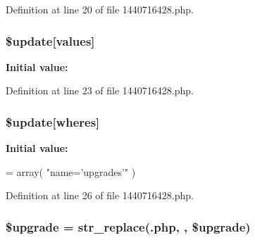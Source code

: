 Definition at line 20 of file 1440716428.\+php.

\subsubsection[{\texorpdfstring{\$update}{$update}}]{\setlength{\rightskip}{0pt plus 5cm}\${\bf update}\mbox{[}\textquotesingle{}values\textquotesingle{}\mbox{]}}\hypertarget{1440716428_8php_ac82a75b4c6df37380ff77c88f041785e}{}\label{1440716428_8php_ac82a75b4c6df37380ff77c88f041785e}
{\bfseries Initial value\+:}


Definition at line 23 of file 1440716428.\+php.

\subsubsection[{\texorpdfstring{\$update}{$update}}]{\setlength{\rightskip}{0pt plus 5cm}\${\bf update}\mbox{[}\textquotesingle{}wheres\textquotesingle{}\mbox{]}}\hypertarget{1440716428_8php_aacde4479a904b32d0f24dea4e01f148c}{}\label{1440716428_8php_aacde4479a904b32d0f24dea4e01f148c}
{\bfseries Initial value\+:}
\begin{DoxyCode}
= array(
        \textcolor{stringliteral}{"name='upgrades'"}
)
\end{DoxyCode}


Definition at line 26 of file 1440716428.\+php.

\subsubsection[{\texorpdfstring{\$upgrade}{$upgrade}}]{\setlength{\rightskip}{0pt plus 5cm}\$upgrade = str\+\_\+replace(\textquotesingle{}.php\textquotesingle{}, \textquotesingle{}\textquotesingle{}, \$upgrade)}\hypertarget{1440716428_8php_a9084097ce600d3cc7a79a20ecaea9906}{}\label{1440716428_8php_a9084097ce600d3cc7a79a20ecaea9906}


